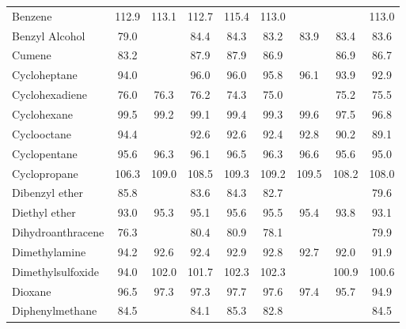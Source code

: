 {\begin{longtable}{m{3.1cm} | c c c c c c c c}
Benzene                          & 112.9     &  113.1   &  112.7   &   115.4     &   113.0    &          &         &   113.0   \\
Benzyl Alcohol                   &  79.0     &          &   84.4   &    84.3     &    83.2    &   83.9   &  83.4   &    83.6   \\
Cumene                           &  83.2     &          &   87.9   &    87.9     &    86.9    &          &  86.9   &    86.7   \\
Cycloheptane                     &  94.0     &          &   96.0   &    96.0     &    95.8    &   96.1   &  93.9   &    92.9   \\
Cyclohexadiene                   &  76.0     &   76.3   &   76.2   &    74.3     &    75.0    &          &  75.2   &    75.5   \\
Cyclohexane                      &  99.5     &   99.2   &   99.1   &    99.4     &    99.3    &   99.6   &  97.5   &    96.8   \\
Cyclooctane                      &  94.4     &          &   92.6   &    92.6     &    92.4    &   92.8   &  90.2   &    89.1   \\
Cyclopentane                     &  95.6     &   96.3   &   96.1   &    96.5     &    96.3    &   96.6   &  95.6   &    95.0   \\
Cyclopropane                     & 106.3     &  109.0   &  108.5   &   109.3     &   109.2    &  109.5   & 108.2   &   108.0   \\
Dibenzyl ether                   &  85.8     &          &   83.6   &    84.3     &    82.7    &          &         &    79.6   \\
Diethyl ether                    &  93.0     &   95.3   &   95.1   &    95.6     &    95.5    &   95.4   &  93.8   &    93.1   \\
Dihydroanthracene                &  76.3     &          &   80.4   &    80.9     &    78.1    &          &         &    79.9   \\
Dimethylamine                    &  94.2     &   92.6   &   92.4   &    92.9     &    92.8    &   92.7   &  92.0   &    91.9   \\
Dimethylsulfoxide                &  94.0     &  102.0   &  101.7   &   102.3     &   102.3    &          & 100.9   &   100.6   \\
Dioxane                          &  96.5     &   97.3   &   97.3   &    97.7     &    97.6    &   97.4   &  95.7   &    94.9   \\
Diphenylmethane                  &  84.5     &          &   84.1   &    85.3     &    82.8    &          &         &    84.5   \\

\end{longtable}}
